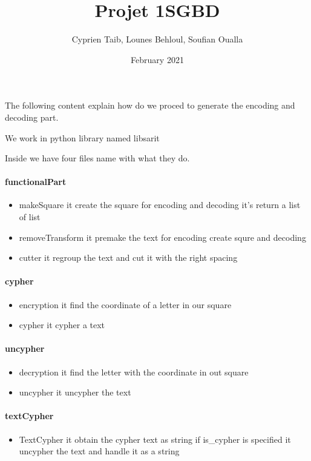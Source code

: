\documentclass{article}
\title{Projet 1SGBD}
\author{Cyprien Taib, Lounes Behloul, Soufian Oualla}
\date{February 2021}
\begin{document}
The following content explain how do we proced to generate the encoding and
decoding part.

We work in python library named libsarit

Inside we have four files name with what they do.

  \paragraph{functionalPart}
    \begin{itemize}
      \item makeSquare it create the square for encoding and decoding it's
        return a list of list

      \item removeTransform it premake the text for encoding create squre and
        decoding
      \item cutter it regroup the text and cut it with the right spacing

    \end{itemize}


  \paragraph{cypher}
    \begin{itemize}      
      \item encryption it find the coordinate of a letter in our square
      \item cypher it cypher a text
    \end{itemize}

  \paragraph{uncypher}
    \begin{itemize}
      \item decryption it find the letter with the coordinate in out square
      \item uncypher it uncypher the text
    \end{itemize}
  
  \paragraph{textCypher}
    \begin{itemize}
      \item TextCypher it obtain the cypher text as string if is\_cypher is
          specified it uncypher the text and handle it as a string
    \end{itemize}
\end{document}

